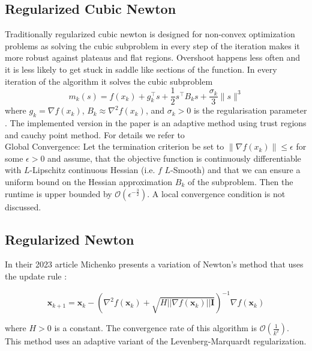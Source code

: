 \documentclass{article}
\begin{document}
\subsection{Regularized Cubic Newton}
Traditionally regularized cubic newton is designed for non-convex optimization problems as solving the cubic subproblem in every step of the iteration makes it more robust against plateaus and flat regions. Overshoot happens less often and it is less likely to get stuck in saddle like sections of the function. In every iteration of the algorithm it solves the cubic subproblem
\[
m_k(s) = f(x_k) + g_k^\top s + \frac{1}{2} s^\top B_k s + \frac{\sigma_k}{3} \|s\|^3
\]
where \( g_k = \nabla f(x_k) \), \( B_k \approx \nabla^2 f(x_k) \), and \( \sigma_k > 0 \) is the regularisation parameter \cite{cartis}. The implemented version in the paper is an adaptive method using trust regions and cauchy point method. For details we refer to \cite{cartis}\\
Global Convergence: Let the termination criterion be set to  $\|\nabla f(x_k)\|\leq \epsilon$ for some $\epsilon > 0$ and assume, that the objective function is continuously differentiable with $L$-Lipschitz continuous Hessian (i.e. $f$ $L$-Smooth) and that we can ensure a uniform bound on the Hessian approximation $B_k$ of the subproblem. Then the runtime is upper bounded by $\mathcal{O}(\epsilon ^{-\frac{3}{2}})$. A local convergence condition is not discussed.

\subsection{Regularized Newton}

In their 2023 article Michenko presents a variation of Newton's method that uses the update rule \cite{mishchenko2023regularized}:

\begin{equation}
\mathbf{x}_{k+1} = \mathbf{x}_{k} - ( \nabla^2 f(\mathbf{x}_k) + \sqrt{ H ||\nabla f(\mathbf{x}_k)||\mathbf{I}})^{-1} \nabla f(\mathbf{x}_k)
  \label{eq:regularized-newton}
\end{equation}

where $H > 0$ is a constant. The convergence rate of this algorithm is $\mathcal{O}(\frac{1}{k^2})$. This method uses an adaptive variant of the Levenberg-Marquardt regularization. 
\newpage
\end{document}
